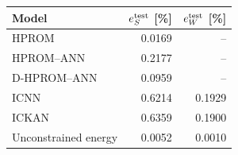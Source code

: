 \begin{tabular}{lrr}
\toprule
Model & $e_S^{\rm test}$ [\%] & $e_W^{\rm test}$ [\%] \\
\midrule
HPROM & 0.0169 & -- \\
HPROM--ANN & 0.2177 & -- \\
D-HPROM--ANN & 0.0959 & -- \\
ICNN & 0.6214 & 0.1929 \\
ICKAN & 0.6359 & 0.1900 \\
Unconstrained energy & 0.0052 & 0.0010 \\
\bottomrule
\end{tabular}

\par{}
